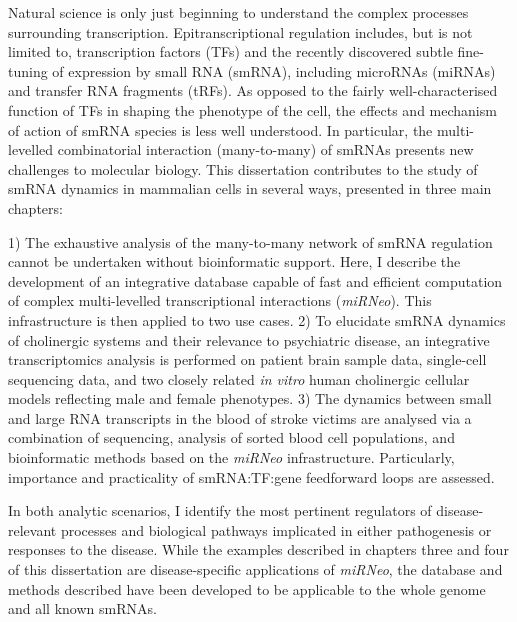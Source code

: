 
Natural science is only just beginning to understand the complex processes surrounding transcription. Epitranscriptional regulation includes, but is not limited to, transcription factors (TFs) and the recently discovered subtle fine-tuning of expression by small RNA (smRNA), including microRNAs (miRNAs) and transfer RNA fragments (tRFs). As opposed to the fairly well-characterised function of TFs in shaping the phenotype of the cell, the effects and mechanism of action of smRNA species is less well understood. In particular, the multi-levelled combinatorial interaction (many-to-many) of smRNAs presents new challenges to molecular biology. This dissertation contributes to the study of smRNA dynamics in mammalian cells in several ways, presented in three main chapters: 

1) The exhaustive analysis of the many-to-many network of smRNA regulation cannot be undertaken without bioinformatic support. Here, I describe the development of an integrative database capable of fast and efficient computation of complex multi-levelled transcriptional interactions (\emph{miRNeo}). This infrastructure is then applied to two use cases. 2) To elucidate smRNA dynamics of cholinergic systems and their relevance to psychiatric disease, an integrative transcriptomics analysis is performed on patient brain sample data, single-cell sequencing data, and two closely related \emph{in vitro} human cholinergic cellular models reflecting male and female phenotypes. 3) The dynamics between small and large RNA transcripts in the blood of stroke victims are analysed via a combination of sequencing, analysis of sorted blood cell populations, and bioinformatic methods based on the \emph{miRNeo} infrastructure. Particularly, importance and practicality of smRNA:TF:gene feedforward loops are assessed. 

In both analytic scenarios, I identify the most pertinent regulators of disease-relevant processes and biological pathways implicated in either pathogenesis or responses to the disease. While the examples described in chapters three and four of this dissertation are disease-specific applications of \emph{miRNeo}, the database and methods described have been developed to be applicable to the whole genome and all known smRNAs.

